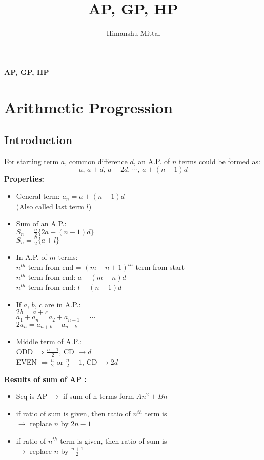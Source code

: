 \documentclass[11pt,a4paper,landscape]{article}
\author{Himanshu Mittal}
\title{AP, GP, HP}
\begin{document}
\begin{multicols*}{3}
\textbf{\Huge{AP, GP, HP}}

\section{Arithmetic Progression}
	\subsection{Introduction}
	For starting term $a$, common difference $d$, an A.P. of $n$ terms could be formed as:
	$$a,\,a+d,\,a+2d,\,\cdots,\,a+(n-1)d$$
	\textbf{\large{Properties:}}
	\begin{itemize}
	\item General term: $a_n = a+(n-1)d$\\
		(Also called last term $l$)
	\item Sum of an A.P.:\\
		$S_n=\frac{n}{2}\{2a+(n-1)d\}$\\ 
		$S_n = \frac{n}{2}\{a+l\}$	
	\item In A.P. of $m$ terms:\\
		$n^{th}$ term from end = $(m-n+1)^{th}$ term from start\\
		$n^{th}$ term from end: $a+(m-n)d$\\
		$n^{th}$ term from end: $l-(n-1)d$
	\item If $a,\,b,\,c$ are in A.P.:\\
		$2b=a+c$\\
		$a_1 + a_n = a_2 + a_{n-1} =\cdots$\\
		$2a_n = a_{n+k} + a_{n-k}$	
	\item Middle term of A.P.:\\
		ODD $\Rightarrow \frac{n+1}{2}$,\hspace{11mm} CD $\rightarrow d$\\
		EVEN $\Rightarrow \frac{n}{2}$ or $\frac{n}{2}+1$, CD $\rightarrow 2d$
	\end{itemize}
\vfill\null
\columnbreak
	\textbf{Results of sum of AP :} 
	\begin{itemize}
  	\item Seq is AP $\rightarrow$ if sum of n terms form $An^{2}+Bn$
	\item if ratio of sum is given, then ratio of $n^{th}$ term is \\
		$\rightarrow$ replace $n$ by $2n-1$
	\item if ratio of $n^{th}$ term is given, then ratio of sum is \\
		$\rightarrow$ replace $n$ by $\displaystyle \frac{n+1}{2}$
	\end{itemize}


\end{multicols*}
\end{document}
